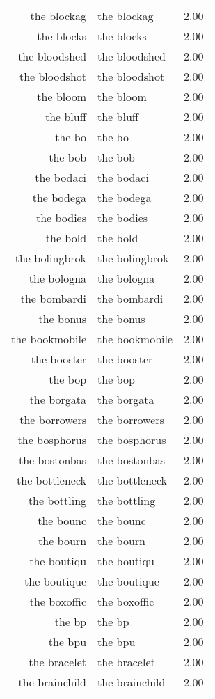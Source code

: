\begin{table}[ht]
\begin{tabular}{rlr}
  the blockag & the blockag & 2.00 \\ 
  the blocks & the blocks & 2.00 \\ 
  the bloodshed & the bloodshed & 2.00 \\ 
  the bloodshot & the bloodshot & 2.00 \\ 
  the bloom & the bloom & 2.00 \\ 
  the bluff & the bluff & 2.00 \\ 
  the bo & the bo & 2.00 \\ 
  the bob & the bob & 2.00 \\ 
  the bodaci & the bodaci & 2.00 \\ 
  the bodega & the bodega & 2.00 \\ 
  the bodies & the bodies & 2.00 \\ 
  the bold & the bold & 2.00 \\ 
  the bolingbrok & the bolingbrok & 2.00 \\ 
  the bologna & the bologna & 2.00 \\ 
  the bombardi & the bombardi & 2.00 \\ 
  the bonus & the bonus & 2.00 \\ 
  the bookmobile & the bookmobile & 2.00 \\ 
  the booster & the booster & 2.00 \\ 
  the bop & the bop & 2.00 \\ 
  the borgata & the borgata & 2.00 \\ 
  the borrowers & the borrowers & 2.00 \\ 
  the bosphorus & the bosphorus & 2.00 \\ 
  the bostonbas & the bostonbas & 2.00 \\ 
  the bottleneck & the bottleneck & 2.00 \\ 
  the bottling & the bottling & 2.00 \\ 
  the bounc & the bounc & 2.00 \\ 
  the bourn & the bourn & 2.00 \\ 
  the boutiqu & the boutiqu & 2.00 \\ 
  the boutique & the boutique & 2.00 \\ 
  the boxoffic & the boxoffic & 2.00 \\ 
  the bp & the bp & 2.00 \\ 
  the bpu & the bpu & 2.00 \\ 
  the bracelet & the bracelet & 2.00 \\ 
  the brainchild & the brainchild & 2.00 \\ 

\end{tabular}
\end{table}
